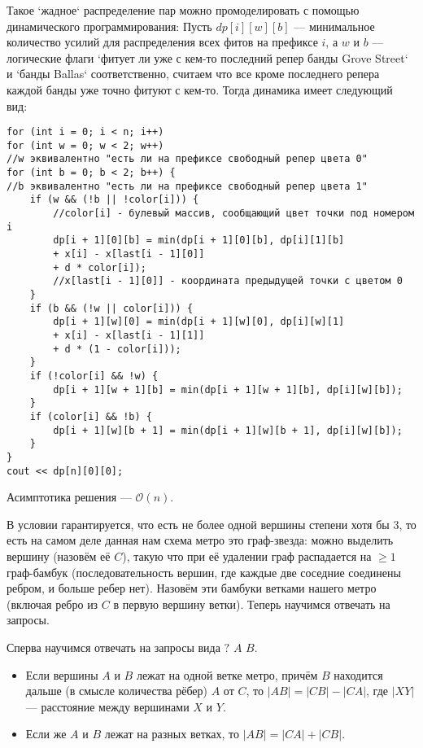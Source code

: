 \documentclass[12pt]{article}
\theoremstyle{definition}
\begin{document}
	Такое `жадное` распределение пар можно промоделировать с помощью динамического программирования: Пусть $dp[i][w][b]$ --- минимальное количество усилий для распределения всех фитов на префиксе $i$, а $w$ и $b$ --- логические флаги `фитует ли уже с кем-то последний репер банды Grove Street` и `банды Ballas` соответственно, считаем что все кроме последнего репера каждой банды уже точно фитуют с кем-то. Тогда динамика имеет следующий вид:
\newpage
\begin{verbatim}    
for (int i = 0; i < n; i++) 
for (int w = 0; w < 2; w++) 
//w эквивалентно "есть ли на префиксе свободный репер цвета 0" 
for (int b = 0; b < 2; b++) {
//b эквивалентно "есть ли на префиксе свободный репер цвета 1" 
	if (w && (!b || !color[i])) { 
    	//color[i] - булевый массив, сообщающий цвет точки под номером i
        dp[i + 1][0][b] = min(dp[i + 1][0][b], dp[i][1][b] 
        + x[i] - x[last[i - 1][0]]
        + d * color[i]); 
        //x[last[i - 1][0]] - координата предыдущей точки с цветом 0
    }
    if (b && (!w || color[i])) {
        dp[i + 1][w][0] = min(dp[i + 1][w][0], dp[i][w][1]
        + x[i] - x[last[i - 1][1]]
        + d * (1 - color[i]));
    }
    if (!color[i] && !w) {
    	dp[i + 1][w + 1][b] = min(dp[i + 1][w + 1][b], dp[i][w][b]);
    }
    if (color[i] && !b) {
   		dp[i + 1][w][b + 1] = min(dp[i + 1][w][b + 1], dp[i][w][b]);
	}
}
cout << dp[n][0][0];
\end{verbatim}
	Асимптотика решения --- $\mathcal{O}(n)$.

\pagebreak


В условии гарантируется, что есть не более одной вершины степени хотя бы 3, то есть на самом деле данная нам схема метро это граф-звезда: можно выделить вершину (назовём её $C$), такую что при её удалении граф распадается на $\ge 1$ граф-бамбук (последовательность вершин, где каждые две соседние соединены ребром, и больше ребер нет). Назовём эти бамбуки ветками нашего метро (включая ребро из $C$ в первую вершину ветки). Теперь научимся отвечать на запросы.

Сперва научимся отвечать на запросы вида $?$ $A$ $B$. 
    \begin{itemize}
    	\item Если вершины $A$ и $B$ лежат на одной ветке метро, причём $B$ находится дальше (в смысле количества рёбер) $A$ от $C$, то $|AB|=|CB| - |CA|$, где $|XY|$ --- расстояние между вершинами $X$ и $Y$.
        \item Если же $A$ и $B$ лежат на разных ветках, то $|AB| = |CA| + |CB|$.
    \end{itemize}
    
\end{document}
